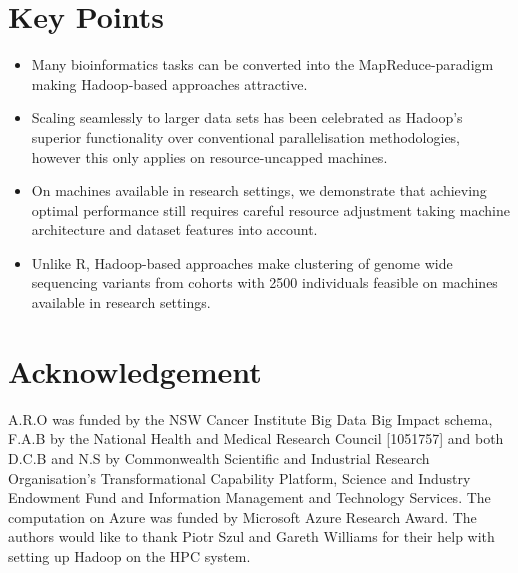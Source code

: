 \documentclass{bioinfo}
\begin{document}
\section{Key Points}
\begin{itemize}
\item Many bioinformatics tasks can be converted into the MapReduce-paradigm making Hadoop-based approaches attractive.
\item Scaling seamlessly to larger data sets has been celebrated as Hadoop's superior functionality over conventional parallelisation methodologies, however this only applies on resource-uncapped machines. 
\item On machines available in research settings, we demonstrate that achieving optimal performance still requires careful resource adjustment taking machine architecture and dataset features into account. 
\item Unlike R, Hadoop-based approaches make clustering of genome wide sequencing variants from cohorts with 2500 individuals feasible on machines available in research settings.
\end{itemize}


\section*{Acknowledgement}
A.R.O was funded by the NSW Cancer Institute Big Data Big Impact schema, F.A.B by the National Health and Medical Research Council [1051757] and both D.C.B and N.S by Commonwealth Scientific and Industrial Research Organisation's Transformational Capability Platform, Science and Industry Endowment Fund and Information Management and Technology Services. The computation on Azure was funded by Microsoft Azure Research Award. 
The authors would like to thank Piotr Szul and Gareth Williams for their help with setting up Hadoop on the HPC system.

%
%
%

%
  
\end{document}
